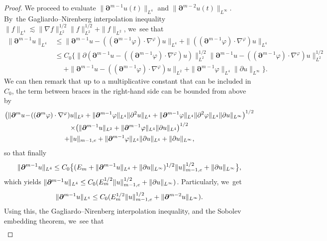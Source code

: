 \documentclass[11pt]{article}
\theoremstyle{definition}
\begin{document}
\begin{proof}
We proceed to evaluate $\|\bm{\partial}^{m-1}u(t)\|_{L^4}$ and $\|\bm{\partial}^{m-2}u(t)\|_{L^\infty}$. By~the Gagliardo--Nirenberg interpolation inequality $\|f\|_{L^4} \lesssim \|\nabla f\|_{L^2}^{1/2}\|f\|_{L^2}^{1/2} + \|f\|_{L^2}$, we~see that
\begin{align*}
\|\bm{\partial}^{m-1} u\|_{L^4}
&\leq \|\bm{\partial}^{m-1} u - ((\bm{\partial}^{m-1}\varphi)\cdot\nabla^\varphi)u\|_{L^4}
+ \|((\bm{\partial}^{m-1}\varphi)\cdot\nabla^\varphi)u\|_{L^4} \\
&\leq C_0 \bigl\{ \|\partial(\bm{\partial}^{m-1} u \! -\! ((\bm{\partial}^{m-1}\varphi)\cdot\nabla^\varphi)u)\|_{L^2}^{1/2}
\|\bm{\partial}^{m-1} u \!-\! ((\bm{\partial}^{m-1}\varphi)\cdot\nabla^\varphi)u\|_{L^2}^{1/2} \\
&\quad\;
+ \|\bm{\partial}^{m-1} u - ((\bm{\partial}^{m-1}\varphi)\cdot\nabla^\varphi)u\|_{L^2}
+ \|\bm{\partial}^{m-1}\varphi\|_{L^4} \|\partial u\|_{L^\infty} \bigr\} .
\end{align*}
We can then remark that up to a multiplicative constant that can be included in $C_0$, the term between braces in the right-hand side can be bounded from above by
\begin{multline*}
\bigl(\|\bm{\partial}^{m} u \!-\! ((\bm{\partial}^{m}\varphi)\cdot\nabla^\varphi)u\|_{L^2}
+ \|\bm{\partial}^{m-1}\varphi\|_{L^4} \|\partial^2u\|_{L^4}
+ \|\bm{\partial}^{m-1}\varphi\|_{L^4} \|\partial^2\varphi\|_{L^4} \|\partial u\|_{L^\infty} \bigr)^{1/2} \\
\times\bigl(\|\bm{\partial}^{m-1}u\|_{L^2} + \|\bm{\partial}^{m-1}\varphi\|_{L^4} \|\partial u\|_{L^4} \bigr)^{1/2} \\
+ \|u\|_{m-1,{\rm e}} + \|\bm{\partial}^{m-1}\varphi\|_{L^4} \|\partial u\|_{L^4} + \|\partial u\|_{L^\infty},
\end{multline*}
so that finally
\[
\|\bm{\partial}^{m-1} u\|_{L^4}
\leq C_0 \bigl\{ (E_m+\|\bm{\partial}^{m-1} u\|_{L^4}+\|\partial u\|_{L^\infty})^{1/2} \|u\|_{m-1,{\rm e}}^{1/2} + \|\partial u\|_{L^\infty} \bigr\},
\]
which yields $\|\bm{\partial}^{m-1} u\|_{L^4} \leq C_0 (E_m^{1/2}\|u\|_{m-1,{\rm e}}^{1/2} + \|\partial u\|_{L^\infty})$.
Particularly, we~get
\begin{equation}\label{CalIneq1}
\|\bm{\partial}^{m-1} u\|_{L^4} \leq C_0 (E_m^{1/2} \|u\|_{m-1,{\rm e}}^{1/2} + \|\bm{\partial}^{m-2} u\|_{L^\infty}).
\end{equation}
Using this, the Gagliardo--Nirenberg interpolation inequality, and the Sobolev embedding theorem, we~see that
\begin{align*}

\end{align*}
\end{proof}
\end{document}
